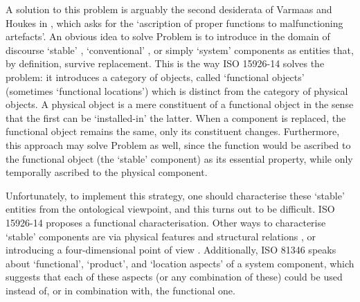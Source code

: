 \documentclass[
]{ceurart}
\begin{document}
\eflist 
A solution to this problem is arguably the second desiderata of Varmaas and Houkes in \cite{vermaasAscribingFunctionsTechnical2003}, which asks for the `ascription of proper functions to malfunctioning artefacts'.
An obvious idea to solve Problem  is to introduce in the domain of discourse `stable' \cite{compagnoComparingOntologicalAlternatives2021}, `conventional' \cite{guarinoArtefactualSystemsMissing2014}, or simply `system' \cite{westDevelopingHighQuality2011} components as entities that, by definition, survive replacement.   
This is the way ISO 15926-14 \cite{kluwerISO159261420202020} solves the problem: it introduces a category of objects, called `functional objects' (sometimes `functional locations') which is distinct from the category of physical objects. A physical object is a mere constituent of a functional object in the sense that the first can be `installed-in' the latter. When a component is replaced, the functional object remains the same, only its constituent changes. Furthermore, this approach may solve Problem  as well, since the function would be ascribed to the functional object (the `stable' component) as its essential property, while only temporally ascribed to the physical component. 

Unfortunately, to implement this strategy, one should characterise these `stable' entities from the ontological viewpoint, and this turns out to be difficult.
ISO 15926-14 proposes a functional characterisation. Other ways to characterise `stable' components are via physical features and structural relations \cite{compagnoComparingOntologicalAlternatives2021}, %
or introducing a four-dimensional point of view \cite{westDevelopingHighQuality2011}. Additionally, ISO 81346 \cite{ISOIEC8134612009} speaks about `functional', `product', and `location aspects' of a system component, which suggests that each of these aspects (or any combination of these) could be used instead of, or in combination with, the functional one.
\end{document}
